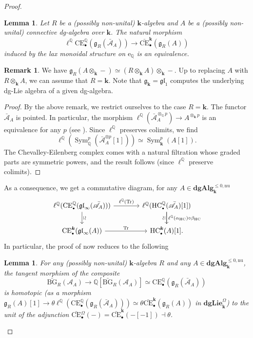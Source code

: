 \documentclass[JEP,XML,SOM,Unicode,NoEqCountersInSection]{cedram}
\let\mathcal\mathscr
\let\autoref\Cref
\let\widebar\bar
\newcommand{\sbullet}{{\scriptscriptstyle\bullet}}
\newtheorem{lem}[thm]{Lemma}
\theoremstyle{definition}
\newtheorem{rmq}[thm]{Remark}
\newcommand{\Q}{\mathbb{Q}}
\newcommand{\dgLie}{\mathbf{dgLie}}
\newcommand{\dgAlg}{\mathbf{dgAlg}}
\DeclareMathOperator{\Sym}{Sym}
\newcommand{\gl}{\mathfrak{gl}}
\newcommand{\HC}{\mathrm{HC}}
\renewcommand{\k}{{\boldsymbol{k}}}
\newcommand{\eQ}{\operatorname{e_\Q}}
\newcommand{\ellQ}{\operatorname{\ell^\Q}}
\newcommand{\Ac}{\mathcal{A}}
\newcommand{\bAc}{\widebar{\mathcal{A}}}
\newcommand{\bCE}{\widebar{\mathrm{CE}}}
\newcommand{\bCEO}{\widebar{\mathrm{CE}}{}^\Omega_\sbullet}
\newcommand{\CE}{\mathrm{CE}}
\newcommand{\Tr}{\operatorname{Tr}}
\newcommand{\g}{\mathfrak{g}}
\newcommand{\bBG}{\widebar{\mathrm{BG}}}
\begin{document}
\begin{proof}
\begin{lem}
Let $R$ be a (possibly non-unital) $\k$-algebra and $A$ be a (possibly non-unital) connective dg-algebra over $\k$.
The natural morphism
\[
\ellQ \CE_\sbullet^\Q(\g_R(\bAc_A)) \to \bCE_\sbullet^\k(\g_R(A))
\]
induced by the lax monoidal structure on $\eQ$ is an equivalence.
\end{lem}
\begin{rmq}\label{rmq:Risk}
We have $\g_R(A \otimes_\k -) \simeq (R \otimes_\k A) \otimes_\k -$. Up to replacing $A$ with $R \otimes_\k A$, we can assume that $R = \k$. Note that $\g_\k = \gl_1$ computes the underlying dg-Lie algebra of a given dg-algebra.
\end{rmq}

\begin{proof}
By the above remark, we restrict ourselves to the case $R = \k$.
The functor $\bAc_A$ is pointed. In particular, the morphism $\ellQ(\bAc_A^{\otimes_\Q p}) \to A^{\otimes_\k p}$ is an equivalence for any $p$ (see \autoref{prop:monoidal}). Since $\ellQ$ preserves colimits, we find
\[
\ellQ(\Sym^p_\Q(\bAc_A^{\otimes p}[1])) \simeq \Sym^p_\k(A[1]).
\]
The Chevalley-Eilenberg complex comes with a natural filtration whose graded parts are symmetric powers, and the result follows (since $\ellQ$ preserve colimits).
\end{proof}

As a consequence, we get a commutative diagram, for any $A \in \dgAlg_\k^{\leq 0, \mathrm{nu}}$
\[
\begin{tikzcd}[column sep=3.8em]
\ellQ(\CE_\sbullet^\Q(\gl_\infty(\bAc_A))) \ar{r}{\ellQ(\Tr)} \ar{d}[sloped, above]{\simeq} & \ellQ(\HC_\sbullet^\Q(\bAc_A)[1]) \ar{d}{\ellQ(\alpha_{\HC}) \circ \beta_{\HC}} \\
\CE_\sbullet^\k(\gl_\infty(A)) \ar{r}{\Tr} & \HC_\sbullet^\k(A)[1]\arrow[u, no head, "\simeq", sloped, above].
\end{tikzcd}
\]
In particular, the proof of \autoref{thm:compLQT} now reduces to the following
\begin{lem}
For any (possibly non-unital) $\k$-algebra $R$ and any $A \in \dgAlg_\k^{\leq 0, \mathrm{nu}}$, the tangent morphism of the composite
\[
\bBG_R(\Ac_A) \to \Q[\bBG_R(\Ac_A)] \simeq \CE_\sbullet^\Q(\g_R(\bAc_A))
\]
is homotopic (as a morphism $\g_R(A)[1] \to \theta \ellQ(\CE_\sbullet^\Q(\g_R(\bAc_A))) \simeq \theta \bCE_\sbullet^\k(\g_R(A))$ in $\dgLie_\k^\Omega$) to the unit of the adjunction $\bCEO(-) = \bCE_\sbullet^\k(-[-1]) \dashv \theta$.
\end{lem}


\end{proof}
\end{document}
